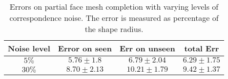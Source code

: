 \begin{table}[th]
\centering
\small
\begin{tabular}{cccc}
    \hline\hline
    Noise level & Error on seen & Err on unseen & total Err \\ \hline 
    $5\%$ & $5.76 \pm 1.8$ & $6.79 \pm 2.04$ & $6.29 \pm 1.75$\\
    $30\%$ & $8.70 \pm 2.13$ & $10.21 \pm 1.79$ & $9.42 \pm 1.37$\\   
  \end{tabular}   
  \vspace{2mm}
\caption{\small Errors on partial face mesh completion with varying levels of correspondence noise. The error is measured as percentage of the shape radius.}
\label{tab:faces}	
\end{table}